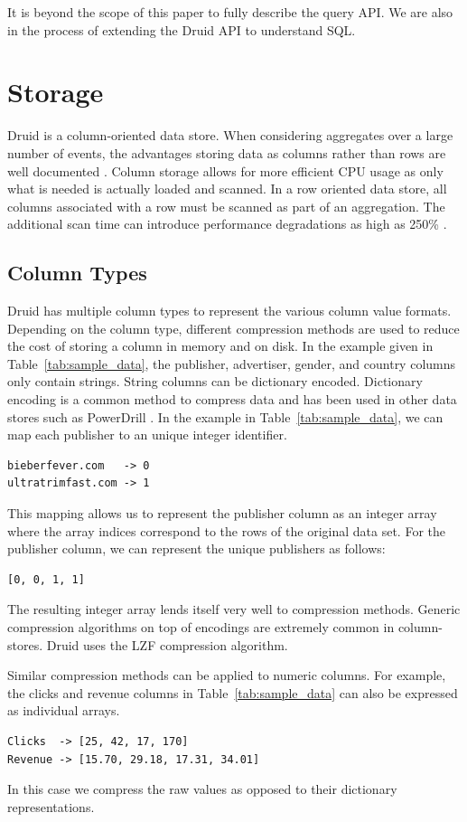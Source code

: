 \documentclass{vldb}
\begin{document}
It is beyond the scope of this paper to fully describe the query API.
We are also in the process of extending the Druid API to understand SQL.

\section{Storage}
\label{sec:storage}
Druid is a column-oriented data store. When considering aggregates
over a large number of events, the advantages storing data as columns
rather than rows are well documented \cite{cattell2011scalable}. Column storage allows for
more efficient CPU usage as only what is needed is actually loaded and
scanned. In a row oriented data store, all columns associated with a
row must be scanned as part of an aggregation. The additional scan
time can introduce performance degradations as high as 250\% \cite{bear2012vertica}.

\subsection{Column Types}
Druid has multiple column types to represent the various column value
formats. Depending on the column type, different compression methods
are used to reduce the cost of storing a column in memory and on
disk. In the example given in Table~\ref{tab:sample_data}, the
publisher, advertiser, gender, and country columns only contain
strings. String columns can be dictionary encoded. Dictionary encoding
is a common method to compress data and has been used in other data
stores such as PowerDrill \cite{hall2012processing}. In the example in
Table~\ref{tab:sample_data}, we can map each publisher to an unique
integer identifier.
\begin{verbatim}
bieberfever.com   -> 0
ultratrimfast.com -> 1
\end{verbatim}
This mapping allows us to represent the publisher column as an integer
array where the array indices correspond to the rows of the original
data set. For the publisher column, we can represent the unique
publishers as follows:
\begin{verbatim}
[0, 0, 1, 1]
\end{verbatim}

The resulting integer array lends itself very well to
compression methods. Generic compression algorithms on top of encodings are
extremely common in column-stores. Druid uses the LZF \cite{liblzf2013} compression
algorithm.

Similar compression methods can be applied to numeric
columns. For example, the clicks and revenue columns in
Table~\ref{tab:sample_data} can also be expressed as individual
arrays.
\begin{verbatim}
Clicks  -> [25, 42, 17, 170]
Revenue -> [15.70, 29.18, 17.31, 34.01]
\end{verbatim}
In this case we compress the raw values as opposed to their dictionary
representations.
\end{document}
